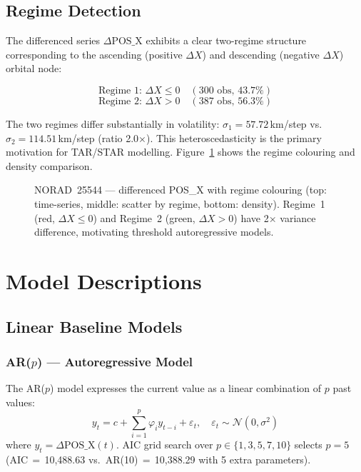\documentclass[conference]{IEEEtran}
\begin{document}
\subsection{Regime Detection}

The differenced series $\Delta\text{POS\_X}$ exhibits a clear two-regime
structure corresponding to the ascending (positive $\Delta X$) and descending
(negative $\Delta X$) orbital node:

\begin{equation}
\text{Regime 1: } \Delta X \leq 0 \quad (300\text{ obs, } 43.7\%)
\label{eq:regime1}
\end{equation}
\begin{equation}
\text{Regime 2: } \Delta X > 0 \quad (387\text{ obs, } 56.3\%)
\label{eq:regime2}
\end{equation}

The two regimes differ substantially in volatility:
$\sigma_1 = 57.72$\,km/step vs.\ $\sigma_2 = 114.51$\,km/step (ratio 2.0$\times$).
This heteroscedasticity is the primary motivation for TAR/STAR modelling.
Figure~\ref{fig:regime} shows the regime colouring and density comparison.

\begin{figure}[H]
  \centering
  \fbox{\rule{0pt}{5cm}\rule{\linewidth}{0pt}}
  \caption{NORAD~25544 --- differenced POS\_X with regime colouring
           (top: time-series, middle: scatter by regime, bottom: density).
           Regime~1 (red, $\Delta X \leq 0$) and Regime~2 (green,
           $\Delta X > 0$) have 2$\times$ variance difference, motivating
           threshold autoregressive models.}
  \label{fig:regime}
\end{figure}

\section{Model Descriptions}
\label{sec:models}

\subsection{Linear Baseline Models}

\subsubsection{AR($p$) --- Autoregressive Model}
The AR($p$) model expresses the current value as a linear combination of
$p$ past values:
\begin{equation}
y_t = c + \sum_{i=1}^{p} \varphi_i y_{t-i} + \varepsilon_t,
\quad \varepsilon_t \sim \mathcal{N}(0,\sigma^2)
\label{eq:ar}
\end{equation}
where $y_t = \Delta\text{POS\_X}(t)$. AIC grid search over
$p \in \{1,3,5,7,10\}$ selects $p=5$
(AIC\,$=$\,10{,}488.63 vs.\ AR(10)\,$=$\,10{,}388.29 with 5 extra
parameters).
\end{document}
